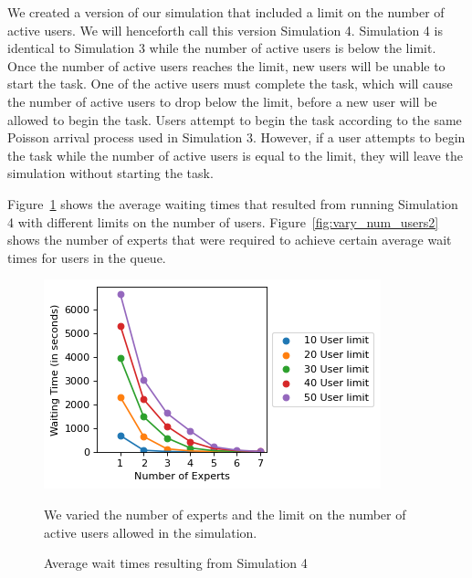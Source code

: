 We created a version of our simulation that included a limit on the number of
active users.
We will henceforth call this version Simulation 4.
Simulation 4 is identical to Simulation 3 while the number of active users is
below the limit.
Once the number of active users reaches the limit, new users will be unable to
start the task.
One of the active users must complete the task, which will cause the number of
active users to drop below the limit, before a new user will be allowed to begin
the task.
Users attempt to begin the task according to the same Poisson arrival process
used in Simulation 3.
However, if a user attempts to begin the task while the number of active users
is equal to the limit, they will leave the simulation without starting the task.

Figure~\ref{fig:vary_num_users} shows the average waiting times that resulted
from running Simulation 4 with different limits on the number of users.
Figure~\ref{fig:vary_num_users2} shows the number of experts that were required
to achieve certain average wait times for users in the queue.

\begin{figure}[h]
  \includegraphics{figures/montecarlo/vary_num_users.png}
  \begin{captiontext}
    We varied the number
    of experts and the limit on the number of active users allowed in the
    simulation.
  \end{captiontext}
  \caption{
    Average wait times resulting from Simulation 4
  }\label{fig:vary_num_users}
\end{figure}

